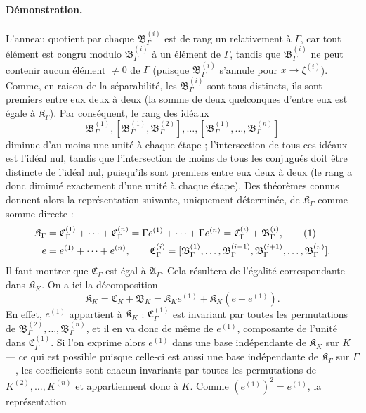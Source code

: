 \paragraph{Démonstration.}
L'anneau quotient par chaque $\mathfrak B_\Gamma^{(i)}$ est de rang un relativement à $\Gamma$, car tout élément est congru modulo $\mathfrak B_\Gamma^{(i)}$ à un élément de $\Gamma$, tandis que $\mathfrak B_\Gamma^{(i)}$ ne peut contenir aucun élément $\ne0$ de $\Gamma$ (puisque $\mathfrak B_\Gamma^{(i)}$ s'annule pour $x\to\xi^{(i)}$). Comme, en raison de la séparabilité, les $\mathfrak B_\Gamma^{(i)}$ sont tous distincts, ils sont premiers entre eux deux à deux (la somme de deux quelconques d'entre eux est égale à $\mathfrak K_\Gamma$). Par conséquent, le rang des idéaux
\[
\mathfrak B_\Gamma^{(1)},
[\mathfrak B_\Gamma^{(1)},\mathfrak B_\Gamma^{(2)}],\ldots,
[\mathfrak B_\Gamma^{(1)},\ldots,\mathfrak B_\Gamma^{(n)}]
\]
diminue d'au moins une unité à chaque étape ; l'intersection de tous ces idéaux est l'idéal nul, tandis que l'intersection de moins de tous les conjugués doit être distincte de l'idéal nul, puisqu'ils sont premiers entre eux deux à deux (le rang a donc diminué exactement d'une unité à chaque étape). Des théorèmes connus donnent alors la représentation suivante, uniquement déterminée, de $\mathfrak K_\Gamma$ comme somme directe :
\begin{align}
\mathfrak K_\Gamma
&=\mathfrak C_\Gamma^{(1)}+\cdots+\mathfrak C_\Gamma^{(n)}
=\Gamma e^{(1)}+\cdots+\Gamma e^{(n)}
=\mathfrak C_\Gamma^{(i)}+\mathfrak B_\Gamma^{(i)}, \tag{1}\\
e&=e^{(1)}+\cdots+e^{(n)},\qquad
\mathfrak C_\Gamma^{(i)}=
[\mathfrak B_\Gamma^{(1)},\ldots,\mathfrak B_\Gamma^{(i-1)},
\mathfrak B_\Gamma^{(i+1)},\ldots,\mathfrak B_\Gamma^{(n)}].\notag
\end{align}
Il faut montrer que $\mathfrak C_\Gamma$ est égal à $\mathfrak A_\Gamma$. Cela résultera de l'égalité correspondante dans $\mathfrak K_K$. On a ici la décomposition
\begin{equation}
\mathfrak K_K=\mathfrak C_K+\mathfrak B_K
=\mathfrak K_K e^{(1)}+\mathfrak K_K(e-e^{(1)}). \tag{2}
\end{equation}
En effet, $e^{(1)}$ appartient à $\mathfrak K_K$ : $\mathfrak C_\Gamma^{(1)}$ est invariant par toutes les permutations de $\mathfrak B_\Gamma^{(2)},\ldots,\mathfrak B_\Gamma^{(n)}$, et il en va donc de même de $e^{(1)}$, composante de l'unité dans $\mathfrak C_\Gamma^{(1)}$. Si l'on exprime alors $e^{(1)}$ dans une base indépendante de $\mathfrak K_K$ sur $K$ --- ce qui est possible puisque celle-ci est aussi une base indépendante de $\mathfrak K_\Gamma$ sur $\Gamma$ ---, les coefficients sont chacun invariants par toutes les permutations de $K^{(2)},\ldots,K^{(n)}$ et appartiennent donc à $K$. Comme $(e^{(1)})^2=e^{(1)}$, la représentation
